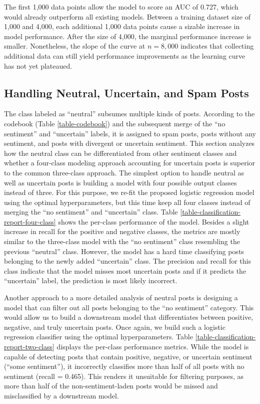 The first 1,000 data points allow the model to score an AUC of 0.727, which would already outperform all existing models. Between a training dataset size of 1,000 and 4,000, each additional 1,000 data points cause a sizable increase in model performance. After the size of 4,000, the marginal performance increase is smaller. Nonetheless, the slope of the curve at $n=8,000$ indicates that collecting additional data can still yield performance improvements as the learning curve has not yet plateaued. 

\subsection{Handling Neutral, Uncertain, and Spam Posts}
\label{section-post-hoc-classes}
The class labeled as ``neutral'' subsumes multiple kinds of posts. According to the codebook (Table \ref{table-codebook}) and the subsequent merge of the ``no sentiment'' and ``uncertain'' labels, it is assigned to spam posts, posts without any sentiment, and posts with divergent or uncertain sentiment. This section analyzes how the neutral class can be differentiated from other sentiment classes and whether a four-class modeling approach accounting for uncertain posts is superior to the common three-class approach.\newline
The simplest option to handle neutral as well as uncertain posts is building a model with four possible output classes instead of three. For this purpose, we re-fit the proposed logistic regression model using the optimal hyperparameters, but this time keep all four classes instead of merging the ``no sentiment'' and ``uncertain'' class. Table \ref{table-classification-report-four-class} shows the per-class performance of the model. Besides a slight increase in recall for the positive and negative classes, the metrics are mostly similar to the three-class model with the ``no sentiment'' class resembling the previous ``neutral'' class. However, the model has a hard time classifying posts belonging to the newly added ``uncertain'' class. The precision and recall for this class indicate that the model misses most uncertain posts and if it predicts the ``uncertain'' label, the prediction is most likely incorrect.



Another approach to a more detailed analysis of neutral posts is designing a model that can filter out all posts belonging to the ``no sentiment'' category. This would allow us to build a downstream model that differentiates between positive, negative, and truly uncertain posts. Once again, we build such a logistic regression classifier using the optimal hyperparameters. Table \ref{table-classification-report-two-class} displays the per-class performance metrics. While the model is capable of detecting posts that contain positive, negative, or uncertain sentiment (``some sentiment''), it incorrectly classifies more than half of all posts with no sentiment (recall = 0.465). This renders it unsuitable for filtering purposes, as more than half of the non-sentiment-laden posts would be missed and misclassified by a downstream model.

